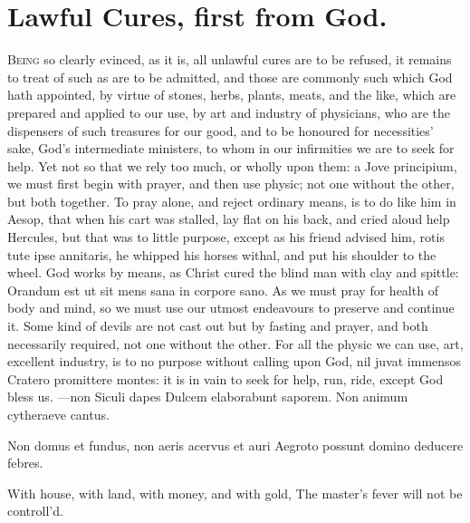{%

\section{Lawful Cures, first from God.}

\lettrine{B}{eing} so clearly evinced, as it is, all unlawful cures are to be
refused, it remains to treat of such as are to be admitted, and those
are commonly such which God hath appointed, by virtue of stones,
herbs, plants, meats, and the like, which are prepared and applied to
our use, by art and industry of physicians, who are the dispensers of
such treasures for our good, and to be honoured for necessities'
sake, God's intermediate ministers, to whom in our infirmities we are
to seek for help. Yet not so that we rely too much, or wholly upon
them: a Jove principium, we must first begin with prayer, and
then use physic; not one without the other, but both together. To pray
alone, and reject ordinary means, is to do like him in Aesop, that when
his cart was stalled, lay flat on his back, and cried aloud help
Hercules, but that was to little purpose, except as his friend advised
him, rotis tute ipse annitaris, he whipped his horses withal, and put
his shoulder to the wheel. God works by means, as Christ cured the
blind man with clay and spittle: Orandum est ut sit mens sana in
corpore sano. As we must pray for health of body and mind, so we must
use our utmost endeavours to preserve and continue it. Some kind of
devils are not cast out but by fasting and prayer, and both necessarily
required, not one without the other. For all the physic we can use,
art, excellent industry, is to no purpose without calling upon God, nil
juvat immensos Cratero promittere montes: it is in vain to seek for
help, run, ride, except God bless us.
---non Siculi dapes
Dulcem elaborabunt saporem.
Non animum cytheraeve cantus.

Non domus et fundus, non aeris acervus et auri
Aegroto possunt domino deducere febres.

With house, with land, with money, and with gold,
The master's fever will not be controll'd.

}
